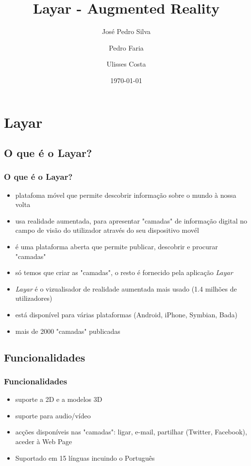 \documentclass{beamer}
\title{Layar - Augmented Reality}
\author{José Pedro Silva \and
Pedro Faria \and
Ulisses Costa
}
\date{\today}
\institute{Engenharia de Linguagens\\
Processamento Estruturado de Documentos
}
\begin{document}
\begin{frame}
   \titlepage
\end{frame}




\section{Layar}
\subsection{O que é o Layar?}

\begin{frame} \frametitle{O que é o Layar?}
\begin{itemize}
\item platafoma móvel que permite descobrir informação sobre o mundo à nossa volta
\pause \item usa realidade aumentada, para apresentar "camadas" de informação digital no campo  de visão do utilizador através do seu dispositivo movél
\pause \item é uma plataforma aberta que permite publicar, descobrir e procurar "camadas"
\pause \item só temos que criar as "camadas", o resto é fornecido pela aplicação \textit{Layar}
\pause \item \textit{Layar} é o vizualisador de realidade aumentada mais usado (1.4 milhões de utilizadores)
\pause \item está disponível para várias plataformas (Android, iPhone, Symbian, Bada)
\pause \item mais de 2000 "camadas" publicadas
\end{itemize}
\end{frame}

\subsection{Funcionalidades}
\begin{frame} \frametitle{Funcionalidades}
\begin{itemize}
\item suporte a  2D e a modelos 3D
\pause \item suporte para audio/vídeo
\pause \item acções disponíveis nas "camadas": ligar, e-mail, partilhar (Twitter, Facebook), aceder à Web Page  
\pause \item Suportado em 15 línguas incuindo o Português
\end{itemize}
\end{frame}
\end{document}
